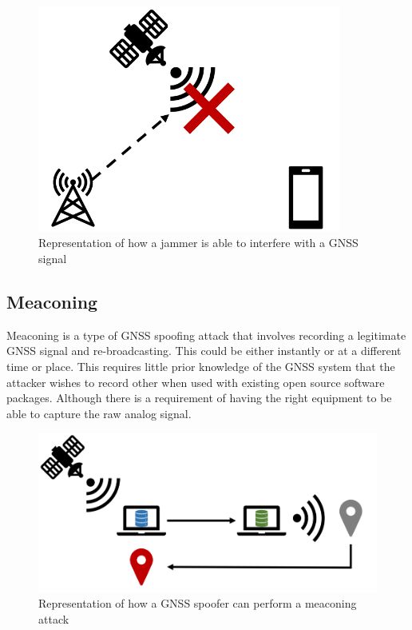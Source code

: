 \begin{figure}[h]
    \begin{centering}
        \includegraphics[width=10cm, keepaspectratio]{Figures/Jamming.png}
        \caption{Representation of how a jammer is able to interfere with a GNSS signal}
    \label{fig:jamming cartoon}
    \end{centering}
\end{figure}

\subsection{Meaconing}
Meaconing is a type of GNSS spoofing attack that involves recording a legitimate GNSS signal and re-broadcasting. This could be either instantly or at a different time or
place. This requires little prior knowledge of the GNSS system that the attacker wishes to record other when used with existing open source software packages. Although
there is a requirement of having the right equipment to be able to capture the raw analog signal.

\begin{figure}[h]
    \begin{centering}
        \includegraphics[width=12cm, keepaspectratio]{Figures/Meaconing.png}
        \caption{Representation of how a GNSS spoofer can perform a meaconing attack}
    \label{fig:meaconing cartoon}
    \end{centering}
\end{figure}

